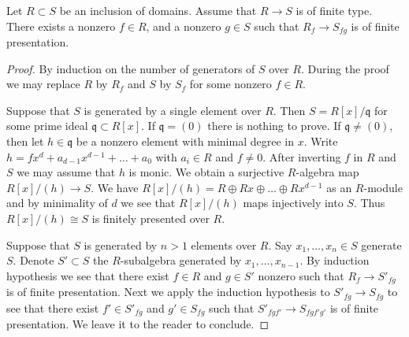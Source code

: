 \begin{lemma}
\label{lemma-generic-finite-presentation}
Let $R \subset S$ be an inclusion of domains.
Assume that $R \to S$ is of finite type.
There exists a nonzero $f \in R$, and a nonzero $g \in S$
such that $R_f \to S_{fg}$ is of finite presentation.
\end{lemma}

\begin{proof}
By induction on the number of generators of $S$ over $R$.
During the proof we may replace $R$ by $R_f$ and $S$ by $S_f$
for some nonzero $f \in R$.

\medskip\noindent
Suppose that $S$ is generated by a single element
over $R$. Then $S = R[x]/\mathfrak q$ for some
prime ideal $\mathfrak q \subset R[x]$. If $\mathfrak q = (0)$
there is nothing to prove. If $\mathfrak q \not = (0)$,
then let $h \in \mathfrak q$ be a nonzero element with minimal
degree in $x$. Write $h = f x^d + a_{d - 1} x^{d - 1} + \ldots + a_0$
with $a_i \in R$ and $f \not = 0$. After inverting $f$
in $R$ and $S$ we may assume that $h$ is monic. We obtain
a surjective $R$-algebra map $R[x]/(h) \to S$.
We have $R[x]/(h) = R \oplus Rx \oplus \ldots \oplus Rx^{d - 1}$
as an $R$-module and by minimality of $d$ we see that
$R[x]/(h)$ maps injectively into $S$. Thus $R[x]/(h) \cong S$
is finitely presented over $R$.

\medskip\noindent
Suppose that $S$ is generated by $n > 1$ elements over $R$.
Say $x_1, \ldots, x_n \in S$ generate $S$. Denote $S' \subset S$
the $R$-subalgebra generated by $x_1, \ldots, x_{n-1}$. By induction
hypothesis we see that there exist $f\in R$ and $g \in S'$
nonzero such that $R_f \to S'_{fg}$ is of finite presentation.
Next we apply the induction hypothesis to $S'_{fg} \to S_{fg}$
to see that there exist $f' \in S'_{fg}$ and
$g' \in S_{fg}$ such that $S'_{fgf'} \to S_{fgf'g'}$
is of finite presentation. We leave it to the reader to conclude.
\end{proof}